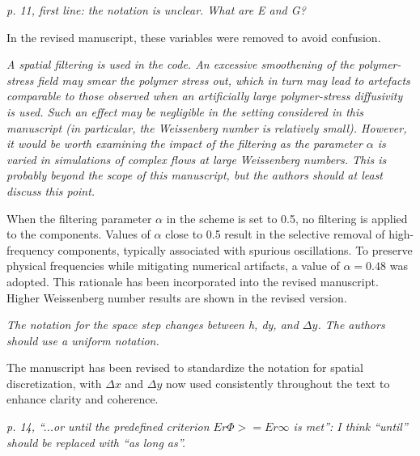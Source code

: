 \documentclass[12pt]{article}
\begin{document}
{\it p. 11, first line: the notation is unclear. What are E and G?} 

\vspace{3mm}
In the revised manuscript, these variables were removed to avoid confusion.
\vspace{3mm}

{\it A spatial filtering is used in the code. An excessive smoothening of the polymer-stress field may smear the polymer stress out, which in turn may lead to artefacts comparable to those observed when an artificially large polymer-stress diffusivity is used. Such an effect may be negligible in the setting considered in this manuscript (in particular, the Weissenberg number is relatively small). However, it would be worth examining the impact of the filtering as the parameter $\alpha$ is varied in simulations of complex flows at large Weissenberg numbers. This is probably beyond the scope of this manuscript, but the authors should at least discuss this point.} 

\vspace{3mm}
When the filtering parameter \(\alpha\) in the scheme is set to 0.5, no filtering is applied to the components. Values of \(\alpha\) close to 0.5 result in the selective removal of high-frequency components, typically associated with spurious oscillations. To preserve physical frequencies while mitigating numerical artifacts, a value of \(\alpha = 0.48\) was adopted. This rationale has been incorporated into the revised manuscript. Higher Weissenberg number results are shown in the revised version.
\vspace{3mm}

{\it The notation for the space step changes between h, dy, and $\Delta y$. The authors should use a uniform notation.} 

\vspace{3mm}
The manuscript has been revised to standardize the notation for spatial discretization, with $\Delta x$ and $\Delta y$ now used consistently throughout the text to enhance clarity and coherence.
\vspace{3mm}

{\it p. 14, “...or until the predefined criterion $Er\Phi >= Er\infty$ is met”: I think “until” should be replaced with “as long as”.} 
\end{document}
